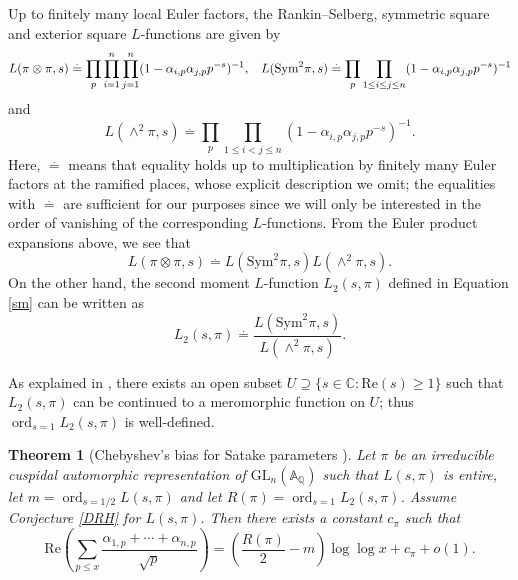 \documentclass[12pt,reqno]{amsart}
\newtheorem{theorem}{Theorem}[section]
\theoremstyle{definition}
\numberwithin{equation}{section}
\newcommand{\GL}{\mathrm{GL}}
\newcommand{\ord}{\mathop{\mathrm{ord}}}
\renewcommand{\Re}{\mathrm{Re}}
\begin{document}
 
Up to finitely many local Euler factors, the Rankin--Selberg, symmetric square and exterior square $L$-functions are given by 
\begin{equation*}
L(\pi \otimes \pi , s) \overset{.}= \prod_p \prod_{i=1}^n \prod_{j=1}^n (1- \alpha_{i, p} \alpha_{j, p} p^{-s})^{-1}, \hspace{3mm} L(\text{Sym}^2 \pi , s) \overset{.}=  \prod_p  \prod_{1 \leq i \leq j \leq n} (1- \alpha_{i, p} \alpha_{j, p} p^{-s})^{-1}
\end{equation*}
and 
\begin{equation}
L(\wedge^2 \pi, s) \overset{.}=  \prod_p  \prod_{1 \leq i< j \leq n} (1- \alpha_{i, p} \alpha_{j, p} p^{-s})^{-1}. 
\end{equation}
Here, $\overset{.}=$ means that equality holds up to multiplication by finitely many Euler factors at the ramified places, whose explicit description we omit; the equalities with $\overset{.}=$ are sufficient for our purposes since we will only be interested in the order of vanishing of the corresponding $L$-functions. From the Euler product expansions above, we see that 
\begin{equation} \label{fact}
L(\pi \otimes \pi, s) \overset{.}= L(\text{Sym}^2\pi, s) L( \wedge^2 \pi, s). 
\end{equation}
On the other hand, the second moment $L$-function $L_2(s, \pi)$ defined in Equation \eqref{sm} can be written as
$$
L_2(s, \pi ) \overset{.}= \frac{L(\text{Sym}^2 \pi , s)}{L(\wedge^2 \pi, s)}.  
$$

As explained in \cite[Example 1]{Devin2020}, there exists an open subset $U \supseteq \{s \in \mathbb C: \Re(s) \geq 1\}$ such that $L_2(s, \pi)$ can be continued to a meromorphic function on $U$; thus $\ord_{s=1} L_2(s, \pi)$ is well-defined. 




\begin{theorem} [{Chebyshev's bias for Satake parameters \cite[Theorem 4.1]{Sheth24B}}] \label{satakebias}
Let $\pi$ be an irreducible cuspidal automorphic representation of $\GL_n(\mathbb A_\mathbb Q)$ such that $L(s, \pi)$ is entire, let $m= \ord_{s=1/2} L(s, \pi)$ and let $R(\pi)= \ord_{s=1} L_2(s, \pi)$. Assume Conjecture \ref{DRH} for $L(s, \pi)$. Then there exists a constant $c_\pi$ such that 
$$
\Re\left(\sum_{p \leqslant x} \frac{\alpha_{1, p}+ \cdots +\alpha_{n, p}}{\sqrt p} \right)= \left( \frac{R(\pi)}{2}-m \right) \log \log x+ c_\pi+ o(1). 
$$
\end{theorem}
\end{document}
